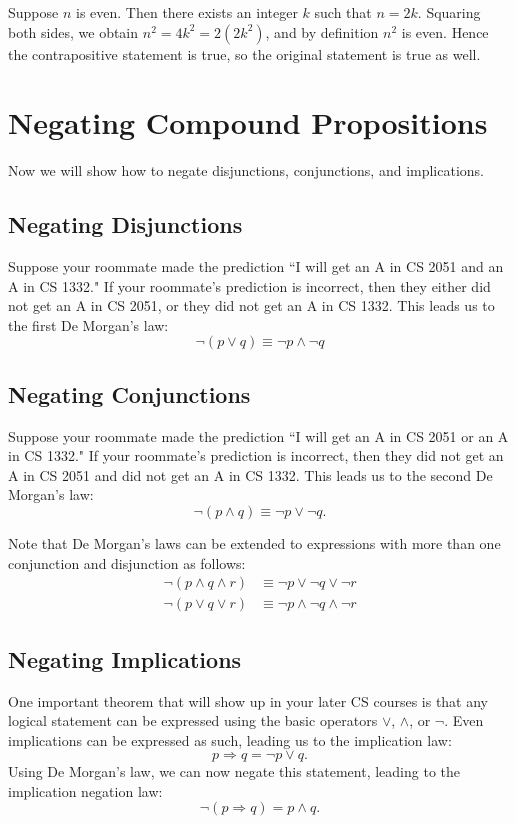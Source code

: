 \documentclass{article}
\begin{document}
    \vspace{1.5mm}
    Suppose $n$ is even. Then there exists an integer $k$ such that $n = 2k$. Squaring both sides, we obtain $n^{2} = 4k^{2} = 2(2k^{2})$, and by definition $n^{2}$ is even. Hence the contrapositive statement is true, so the original statement is true as well.
        
\section*{Negating Compound Propositions}
    Now we will show how to negate disjunctions, conjunctions, and implications.

\subsection*{Negating Disjunctions}
    Suppose your roommate made the prediction ``I will get an A in CS 2051 and an A in CS 1332." If your roommate's prediction is incorrect, then they either did not get an A in CS 2051, or they did not get an A in CS 1332. This leads us to the first De Morgan's law: $$\neg(p \lor q) \equiv   \neg p \land \neg q$$

\subsection*{Negating Conjunctions}
    Suppose your roommate made the prediction ``I will get an A in CS 2051 or an A in CS 1332." If your roommate's prediction is incorrect, then they did not get an A in CS 2051 and did not get an A in CS 1332. This leads us to the second De Morgan's law: $$\neg (p \land q) \equiv \neg p \lor \neg q.$$
    
    \vspace{1.5mm}
    Note that De Morgan’s laws can be extended to expressions with more than one conjunction and disjunction as follows: 
    \begin{align*}
        \neg (p \land q \land r) &\equiv \neg p \lor \neg q \lor \neg r \\
        \neg (p \lor q \lor r) &\equiv \neg p \land \neg q \land \neg r
    \end{align*}
        
\subsection*{Negating Implications}
    One important theorem that will show up in your later CS courses is that any logical statement can be expressed using the basic operators $\lor$, $\land$, or $\neg$. Even implications can be expressed as such, leading us to the implication law: $$p \Rightarrow q = \neg p \lor q.$$ Using De Morgan's law, we can now negate this statement, leading to the implication negation law: $$\neg(p \Rightarrow q) = p \land q.$$
    
\end{document}
